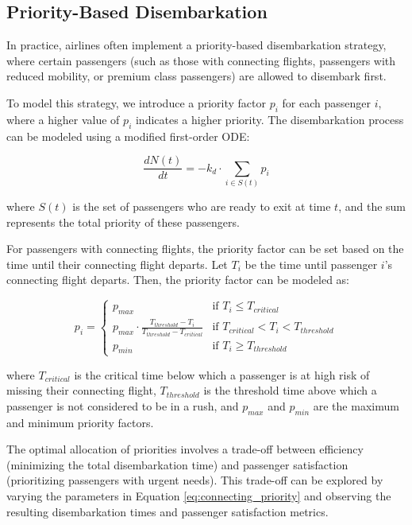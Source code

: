 \subsection{Priority-Based Disembarkation}

In practice, airlines often implement a priority-based disembarkation strategy, where certain passengers (such as those with connecting flights, passengers with reduced mobility, or premium class passengers) are allowed to disembark first.

To model this strategy, we introduce a priority factor $p_i$ for each passenger $i$, where a higher value of $p_i$ indicates a higher priority. The disembarkation process can be modeled using a modified first-order ODE:

\begin{equation}
\frac{dN(t)}{dt} = -k_d \cdot \sum_{i \in S(t)} p_i
\label{eq:priority_based}
\end{equation}

where $S(t)$ is the set of passengers who are ready to exit at time $t$, and the sum represents the total priority of these passengers.

For passengers with connecting flights, the priority factor can be set based on the time until their connecting flight departs. Let $T_i$ be the time until passenger $i$'s connecting flight departs. Then, the priority factor can be modeled as:

\begin{equation}
p_i = 
\begin{cases}
p_{max} & \text{if } T_i \leq T_{critical} \\
p_{max} \cdot \frac{T_{threshold} - T_i}{T_{threshold} - T_{critical}} & \text{if } T_{critical} < T_i < T_{threshold} \\
p_{min} & \text{if } T_i \geq T_{threshold}
\end{cases}
\label{eq:connecting_priority}
\end{equation}

where $T_{critical}$ is the critical time below which a passenger is at high risk of missing their connecting flight, $T_{threshold}$ is the threshold time above which a passenger is not considered to be in a rush, and $p_{max}$ and $p_{min}$ are the maximum and minimum priority factors.

The optimal allocation of priorities involves a trade-off between efficiency (minimizing the total disembarkation time) and passenger satisfaction (prioritizing passengers with urgent needs). This trade-off can be explored by varying the parameters in Equation \ref{eq:connecting_priority} and observing the resulting disembarkation times and passenger satisfaction metrics.

